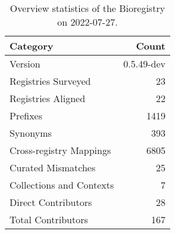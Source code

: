 \begin{table}
\centering
\caption{Overview statistics of the Bioregistry on 2022-07-27.}
\label{tab:bioregistry-summary}
\begin{tabular}{lr}
\toprule
                Category &      Count \\
\midrule
                 Version & 0.5.49-dev \\
     Registries Surveyed &         23 \\
      Registries Aligned &         22 \\
                Prefixes &       1419 \\
                Synonyms &        393 \\
 Cross-registry Mappings &       6805 \\
      Curated Mismatches &         25 \\
Collections and Contexts &          7 \\
     Direct Contributors &         28 \\
      Total Contributors &        167 \\
\bottomrule
\end{tabular}
\end{table}
